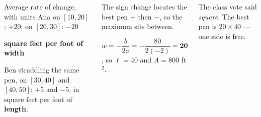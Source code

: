 \documentclass[aspectratio=169, 11pt]{beamer}
\begin{document}
\begin{frame}[t, plain]

  \begin{columns}[T, onlytextwidth]
      \begin{block}{Average rate of change, with units}
        Ana on \([10,20]\): \(+20\); on \([20,30]\): \(-20\)

        \smallskip
        \textbf{square feet per foot of width}

        \smallskip
        Ben straddling the same pen, on \([30,40]\) and \([40,50]\): \(+5\) and
        \(-5\), in square feet per foot of \textbf{length}.
      \end{block}

      \begin{block}{The sign change locates the best pen}
        \(+\) then \(-\), so the maximum sits between.

        \smallskip
        \(w = -\dfrac{b}{2a} = -\dfrac{80}{2(-2)} = \mathbf{20}\), so
        \(\ell = 40\) and \(A = 800\) ft\(^2\).
      \end{block}

      \medskip
      \begin{center}
        The class vote said \textit{square}. The best pen is
        \(20 \times 40\) --- one side is free.
      \end{center}
  \end{columns}
\end{frame}
\end{document}
